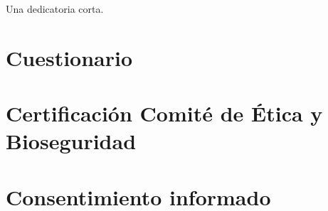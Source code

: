 \documentclass{umemoria}
\begin{document}

\begin{dedicatoria}
Una dedicatoria corta.
\end{dedicatoria}

\begin{thanks}



\end{thanks}

\tableofcontents
\listoftables %
\listoffigures %

\mainmatter









\printbibliography[
    heading=bibintoc,
]

\begin{appendices}

% 

\chapter{Cuestionario}
\label{anexo:cuestionario}


\chapter{Certificación Comité de Ética y Bioseguridad}
\label{anexo:certificacion-comite-de-etica-y-bioseguridad}


\chapter{Consentimiento informado}
\label{anexo:consentimiento}




\end{appendices}
\end{document}
